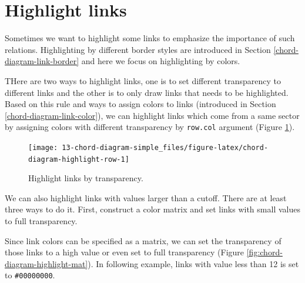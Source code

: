 \documentclass[]{book}
\newenvironment{Shaded}{\begin{snugshade}}{\end{snugshade}}
\newcommand{\KeywordTok}[1]{\textcolor[rgb]{0.13,0.29,0.53}{\textbf{#1}}}
\newcommand{\DataTypeTok}[1]{\textcolor[rgb]{0.13,0.29,0.53}{#1}}
\newcommand{\DecValTok}[1]{\textcolor[rgb]{0.00,0.00,0.81}{#1}}
\newcommand{\StringTok}[1]{\textcolor[rgb]{0.31,0.60,0.02}{#1}}
\newcommand{\OperatorTok}[1]{\textcolor[rgb]{0.81,0.36,0.00}{\textbf{#1}}}
\newcommand{\NormalTok}[1]{#1}
\theoremstyle{definition}
\theoremstyle{definition}
\theoremstyle{remark}
\begin{document}
\section{Highlight links}\label{highlight-links}

Sometimes we want to highlight some links to emphasize the importance of
such relations. Highlighting by different border styles are introduced
in Section \ref{chord-diagram-link-border} and here we focus on
highlighting by colors.

THere are two ways to highlight links, one is to set different
transparency to different links and the other is to only draw links that
needs to be highlighted. Based on this rule and ways to assign colors to
links (introduced in Section \ref{chord-diagram-link-color}), we can
highlight links which come from a same sector by assigning colors with
different transparency by \texttt{row.col} argument (Figure
\ref{fig:chord-diagram-highlight-row}).

\begin{Shaded}
\end{Shaded}

\begin{figure}

{\centering \texttt{[image: 13-chord-diagram-simple\_files/figure-latex/chord-diagram-highlight-row-1]} 

}

\caption{Highlight links by transparency.}\label{fig:chord-diagram-highlight-row}
\end{figure}

We can also highlight links with values larger than a cutoff. There are
at least three ways to do it. First, construct a color matrix and set
links with small values to full transparency.

Since link colors can be specified as a matrix, we can set the
transparency of those links to a high value or even set to full
transparency (Figure \ref{fig:chord-diagram-highlight-mat}). In
following example, links with value less than 12 is set to
\texttt{\#00000000}.

\begin{Shaded}
\end{Shaded}
\end{document}

